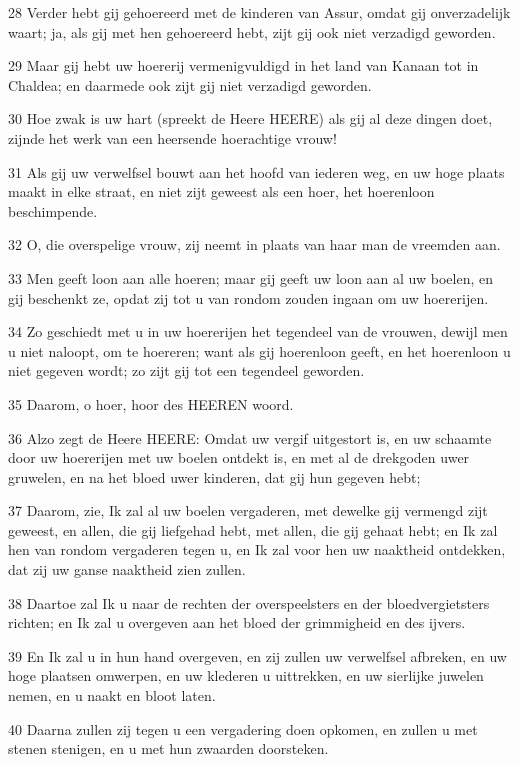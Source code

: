 \par 28 Verder hebt gij gehoereerd met de kinderen van Assur, omdat gij onverzadelijk waart; ja, als gij met hen gehoereerd hebt, zijt gij ook niet verzadigd geworden.
\par 29 Maar gij hebt uw hoererij vermenigvuldigd in het land van Kanaan tot in Chaldea; en daarmede ook zijt gij niet verzadigd geworden.
\par 30 Hoe zwak is uw hart (spreekt de Heere HEERE) als gij al deze dingen doet, zijnde het werk van een heersende hoerachtige vrouw!
\par 31 Als gij uw verwelfsel bouwt aan het hoofd van iederen weg, en uw hoge plaats maakt in elke straat, en niet zijt geweest als een hoer, het hoerenloon beschimpende.
\par 32 O, die overspelige vrouw, zij neemt in plaats van haar man de vreemden aan.
\par 33 Men geeft loon aan alle hoeren; maar gij geeft uw loon aan al uw boelen, en gij beschenkt ze, opdat zij tot u van rondom zouden ingaan om uw hoererijen.
\par 34 Zo geschiedt met u in uw hoererijen het tegendeel van de vrouwen, dewijl men u niet naloopt, om te hoereren; want als gij hoerenloon geeft, en het hoerenloon u niet gegeven wordt; zo zijt gij tot een tegendeel geworden.
\par 35 Daarom, o hoer, hoor des HEEREN woord.
\par 36 Alzo zegt de Heere HEERE: Omdat uw vergif uitgestort is, en uw schaamte door uw hoererijen met uw boelen ontdekt is, en met al de drekgoden uwer gruwelen, en na het bloed uwer kinderen, dat gij hun gegeven hebt;
\par 37 Daarom, zie, Ik zal al uw boelen vergaderen, met dewelke gij vermengd zijt geweest, en allen, die gij liefgehad hebt, met allen, die gij gehaat hebt; en Ik zal hen van rondom vergaderen tegen u, en Ik zal voor hen uw naaktheid ontdekken, dat zij uw ganse naaktheid zien zullen.
\par 38 Daartoe zal Ik u naar de rechten der overspeelsters en der bloedvergietsters richten; en Ik zal u overgeven aan het bloed der grimmigheid en des ijvers.
\par 39 En Ik zal u in hun hand overgeven, en zij zullen uw verwelfsel afbreken, en uw hoge plaatsen omwerpen, en uw klederen u uittrekken, en uw sierlijke juwelen nemen, en u naakt en bloot laten.
\par 40 Daarna zullen zij tegen u een vergadering doen opkomen, en zullen u met stenen stenigen, en u met hun zwaarden doorsteken.
